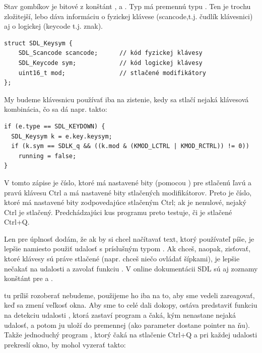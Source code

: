 Stav gombíkov je bitové  z konštánt 
,
 a
. Typ  má premennú typu  . Ten je trochu zložitejší, 
lebo dáva informáciu o fyzickej klávese
({\robotomono scancode},t.j. čudlík klávesnici) aj o logickej ({\robotomono keycode} t.j. znak).

\begin{lstlisting}
struct SDL_Keysym {
    SDL_Scancode scancode;      // kód fyzickej klávesy
    SDL_Keycode sym;            // kód logickej klávesy
    uint16_t mod;               // stlačené modifikátory
};
\end{lstlisting}

My budeme klávesnicu používať iba na zistenie, kedy sa stlačí nejaká klávesová kombinácia, čo sa dá napr. takto:

\begin{lstlisting}
if (e.type == SDL_KEYDOWN) {
  SDL_Keysym k = e.key.keysym;
  if (k.sym == SDLK_q && ((k.mod & (KMOD_LCTRL | KMOD_RCTRL)) != 0))
    running = false;
}
\end{lstlisting}

V tomto zápise  je číslo, ktoré má nastavené bity (pomocou ) 
pre stlačenú ľavú a pravú klávesu {\robotomono Ctrl} a  má nastavené bity
stlačených modifikátorov. Preto  je číslo, ktoré má nastavené bity zodpovedajúce stlačeným {\robotomono Ctrl}; ak je nenulové,
nejaký {\robotomono Ctrl} je stlačený. Predchádzajúci kus programu preto testuje, či je stlačené {\robotomono Ctrl+Q}.

Len pre úplnosť dodám, že ak by si chcel načítavať text, ktorý používateľ píše, je lepšie namiesto \hbox{} použiť udalosť 
s príslušným typom . Ak chceš, naopak, zisťovať, ktoré klávesy sú práve stlačené (napr. chceš niečo ovládať šípkami),
je lepšie nečakať na udalosti a zavolať funkciu .
V online dokumentácii SDL sú aj zoznamy konštánt pre  a .

 tu príliš rozoberať nebudeme, použijeme ho iba na to, aby sme vedeli zareagovať, keď sa zmení veľkosť okna. Aby sme to celé dali dokopy, ostáva predstaviť
funkciu na detekciu udalosti \hbox{,} 
ktorá zastaví program a čaká, 
kým nenastane nejaká udalosť, a potom ju uloží do premennej (ako parameter dostane pointer na 
ňu). Takže jednoduchý program , ktorý čaká na stlačenie {\robotomono Ctrl+Q} a pri každej udalosti prekreslí okno, by mohol vyzerať
takto:

